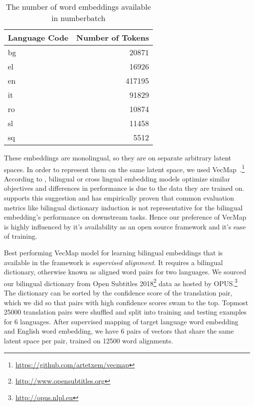 \begin{table}[hbtp]
    \centering
    \begin{tabulary}{1.0\linewidth}{L R}
        \toprule
        \textbf{Language Code} & \textbf{Number of Tokens} \\
        \midrule
        bg & 20871 \\
        el & 16926 \\
        en & 417195 \\
        it & 91829 \\
        ro & 10874 \\
        sl & 11458 \\
        sq & 5512 \\
        \bottomrule
    \end{tabulary}
    \caption{The number of word embeddings available in numberbatch}%
    \label{tab:numberbatch_stats}
\end{table}

These embeddings are monolingual, so they are on separate arbitrary latent spaces.
In order to represent them on the same latent space, we used VecMap~\cite{artetxe_robust_2018,artetxe_generalizing_2018,artetxe_learning_2017,artetxe_learning_2016}.\footnote{\url{https://github.com/artetxem/vecmap}}
According to \textcite{ruder_survey_2017}, bilingual or cross lingual embedding models optimize similar objectives and differences in performance is due to the data they are trained on.
\textcite{glavas_how_2019} supports this suggestion and has empirically proven that common evaluation metrics like bilingual dictionary induction is not representative for the bilingual embedding's performance on downstream tasks.
Hence our preference of VecMap is highly influenced by it's availability as an open source framework and it's ease of training.

Best performing VecMap model for learning bilingual embeddings that is available in the framework is \emph{supervised alignment}.
It requires a bilingual dictionary, otherwise known as aligned word pairs for two languages.
We sourced our bilingual dictionary from Open Subtitles 2018\footnote{\url{http://www.opensubtitles.org}} data as hosted by OPUS.\footnote{\url{http://opus.nlpl.eu}}
The dictionary can be sorted by the confidence score of the translation pair, which we did so that pairs with high confidence scores swam to the top.
Topmost 25000 translation pairs were shuffled and split into training and testing examples for 6 languages.
After supervised mapping of target language word embedding and English word embedding, we have 6 pairs of vectors that share the same latent space per pair, trained on 12500 word alignments.

